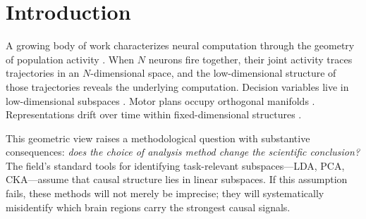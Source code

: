 \documentclass{article}
\begin{document}
\begin{abstract}
%
A structured variational autoencoder \citep{narayanaswamy2017learning} that explicitly partitions latent dimensions into choice-relevant and choice-irrelevant subspaces removes the subspace bias ($\Delta\rho = +1.06$, 95\% CI $[0.31, 1.51]$; 73/73 regions, $p = 5.7 \times 10^{-14}$). The key ingredient is the structured latent split, not encoder nonlinearity---replacing the nonlinear encoder with a linear one changes nothing ($p = 0.65$).
%
Shuffled-label control confirms the VAE learns genuine structure ($p = 6 \times 10^{-8}$, 24/24 regions), random-direction null is rejected in all 73 regions, and results are robust to leave-one-mouse-out jackknife, neuron sub-sampling, and UMAP stochasticity (20 seeds $\times$ 9 configurations). The advantage generalizes across four task variables (all 73/73, all $p < 10^{-13}$), engagement and choice subspaces are near-orthogonal ($d_G = 2.41$), and a potent/null decomposition confirms the mechanism ($\rho = -0.86$, $p = 5 \times 10^{-22}$).
%
Both subspace misidentification and metric inconsistency trace to the same dimensionality-stratified structure: brain regions form dimensional strata across which linear and causal geometries diverge, with optogenetically validated consequences for which regions are identified as causally important.
\end{abstract}

\section{Introduction}

A growing body of work characterizes neural computation through the geometry of population activity \citep{cunningham2014dimensionality, gallego2017neural}. When $N$ neurons fire together, their joint activity traces trajectories in an $N$-dimensional space, and the low-dimensional structure of those trajectories reveals the underlying computation. Decision variables live in low-dimensional subspaces \citep{steinmetz2019distributed}. Motor plans occupy orthogonal manifolds \citep{gallego2017neural}. Representations drift over time within fixed-dimensional structures \citep{driscoll2022representational}.

This geometric view raises a methodological question with substantive consequences: \emph{does the choice of analysis method change the scientific conclusion?} The field's standard tools for identifying task-relevant subspaces---LDA, PCA, CKA---assume that causal structure lies in linear subspaces. If this assumption fails, these methods will not merely be imprecise; they will systematically misidentify which brain regions carry the strongest causal signals.
\end{document}
